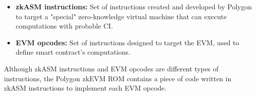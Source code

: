 \begin{itemize}
    \item \textbf{zkASM instructions:} Set of instructions created and developed by Polygon to target a "special" zero-knowledge virtual machine that can execute computations with probable CI.
    \item \textbf{EVM opcodes:} Set of instructions designed to target the EVM, used to define smart contract's computations.
\end{itemize}

Although zkASM instructions and EVM opcodes are different types of instructions, the Polygon zkEVM ROM contains a piece of code written in zkASM instructions to implement each EVM opcode.
